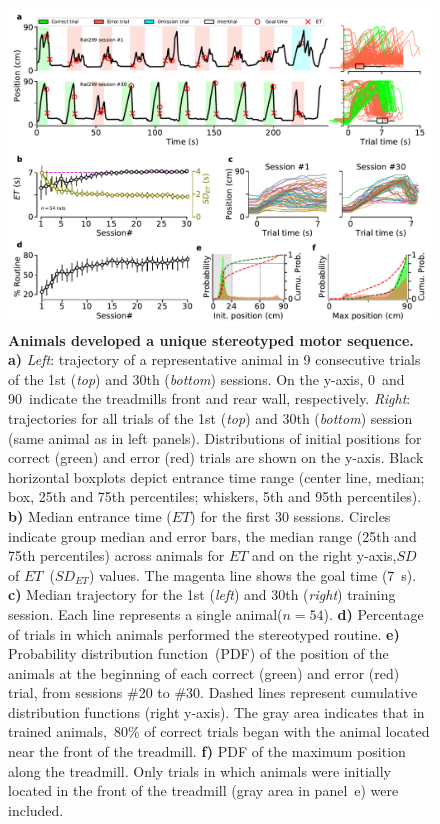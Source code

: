 \begin{figure}[bt!]
    \begin{center}
      \includegraphics[width=\textwidth]{ch-time/figures/CtrlTrd.pdf}
      \caption[Control Condition]
      {\textbf{Animals developed a unique stereotyped motor sequence.}
      \textbf{a)}
      \textit{Left}: trajectory of a representative animal in 9 consecutive trials of the 1st (\textit{top}) and 30th (\textit{bottom}) sessions.
      On the y-axis, 0~and 90~indicate the treadmills front and rear wall, respectively.
      \textit{Right}: trajectories for all trials of the 1st (\textit{top}) and 30th (\textit{bottom}) session (same animal as in left panels).
      Distributions of initial positions for correct (green) and error (red) trials are shown on the y-axis.
      Black horizontal boxplots depict entrance time range (center line, median; box, 25th and 75th percentiles; whiskers, 5th and 95th percentiles).
      \textbf{b)}
      Median entrance time ($ET$) for the first 30 sessions.
      Circles indicate group median and error bars, the median range (25th and 75th percentiles) across animals for $ET$ and on the right y-axis,$SD$ of $ET$~($SD_{ET}$) values.
      The magenta line shows the goal time (7~s).
      \textbf{c)}
      Median trajectory for the 1st (\textit{left}) and 30th (\textit{right}) training session.
      Each line represents a single animal($n=54$).
      \textbf{d)}
      Percentage of trials in which animals performed the stereotyped routine.
      \textbf{e)}
      Probability distribution function~(PDF) of the position of the animals at the beginning of each correct (green) and error (red) trial, from sessions \#20 to \#30.
      Dashed lines represent cumulative distribution functions (right y-axis).
      The gray area indicates that in trained animals,~80\% of correct trials began with the animal located near the front of the treadmill.
      \textbf{f)}
      PDF of the maximum position along the treadmill.
      Only trials in which animals were initially located in the front of the treadmill (gray area in panel~e) were included.
    }
    \label{fig:time:CtrlTrd}
    \end{center}
  \end{figure}